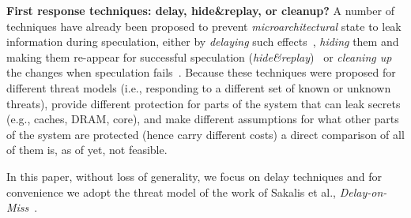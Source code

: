 \noindent \textbf{First response techniques: delay, hide\&replay, or cleanup?}
A number of techniques have already been proposed to prevent \emph{microarchitectural} state to leak information during speculation, either by %
\emph{delaying} such effects~\cite{sakalis+:ISCA2019vp,weisse2019nda,yu_speculative:MICRO2019-STT}, %
\emph{hiding} them and making them re-appear for successful speculation (\emph{hide\&replay})~\cite{yan_invisispec:MICRO2018,sakalis+:CF2019ghost} or %
\emph{cleaning up} the changes when speculation fails~\cite{saileshwar2019cleanupspec}. %
Because these techniques were proposed for different threat models (i.e.,  responding to a different set of known or unknown threats), provide different protection for parts of the system that can leak secrets (e.g., caches, DRAM, core), and make different assumptions for what other parts of the system are protected (hence carry different costs) a direct comparison of all of them is, as of yet, not feasible.
In this paper, without loss of generality, we focus on delay techniques and for convenience we adopt the threat model of the work of Sakalis et al., \emph{Delay-on-Miss}~\cite{sakalis+:CF2019ghost}. 
